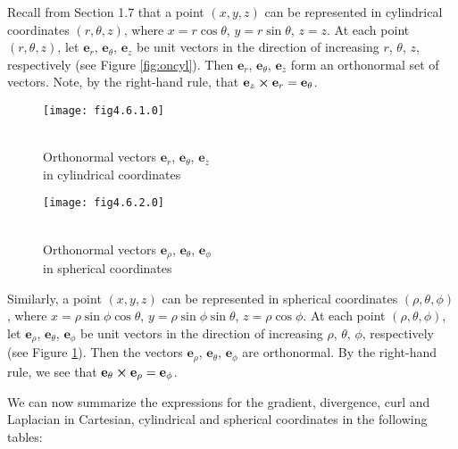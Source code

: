 Recall from Section 1.7 that a point $(x,y,z)$ can be represented in cylindrical coordinates $(r, \theta , z)$, where
$x=r\cos \theta$, $y=r\sin \theta$, $z=z$. At each point $(r, \theta , z)$, let $\textbf{e}_{r}$, $\textbf{e}_{\theta}$,
$\textbf{e}_{z}$ be unit vectors in the direction of increasing $r$, $\theta$, $z$, respectively (see Figure
\ref{fig:oncyl}). Then $\textbf{e}_{r}$, $\textbf{e}_{\theta}$, $\textbf{e}_{z}$ form an orthonormal set of vectors.
Note, by the right-hand rule, that $\textbf{e}_{z} \bm{\times} \textbf{e}_{r}=\textbf{e}_{\theta}$.
\begin{figure}[h]
\begin{minipage}[t]{7.5cm}
 \begin{center}
  \texttt{[image: fig4.6.1.0]}
 \end{center}
 \caption[]{\\Orthonormal vectors $\textbf{e}_{r}$, $\textbf{e}_{\theta}$, $\textbf{e}_{z}$\\in cylindrical coordinates}
 \label{fig:oncyl}
\end{minipage}
\begin{minipage}[t]{7.5cm}
 \begin{center}
  \texttt{[image: fig4.6.2.0]}
 \end{center}
 \caption[]{\\Orthonormal vectors $\textbf{e}_{\rho}$, $\textbf{e}_{\theta}$,
  $\textbf{e}_{\phi}$\\in spherical coordinates}
 \label{fig:onsph}
\end{minipage}
\end{figure}

Similarly, a point $(x,y,z)$ can be represented in spherical coordinates $(\rho, \theta , \phi)$, where
$x=\rho\sin \phi \cos \theta$, $y=\rho\sin \phi \sin \theta$, $z=\rho\cos \phi$. At each point $(\rho, \theta , \phi)$,
let $\textbf{e}_{\rho}$, $\textbf{e}_{\theta}$, $\textbf{e}_{\phi}$ be unit vectors in the direction of increasing
$\rho$, $\theta$, $\phi$, respectively (see Figure \ref{fig:onsph}). Then the vectors $\textbf{e}_{\rho}$,
$\textbf{e}_{\theta}$, $\textbf{e}_{\phi}$ are orthonormal. By the right-hand rule, we see that
$\textbf{e}_{\theta} \bm{\times} \textbf{e}_{\rho}=\textbf{e}_{\phi}$.

We can now summarize the expressions for the gradient, divergence, curl and Laplacian in Cartesian, cylindrical and
spherical coordinates in the following tables:

